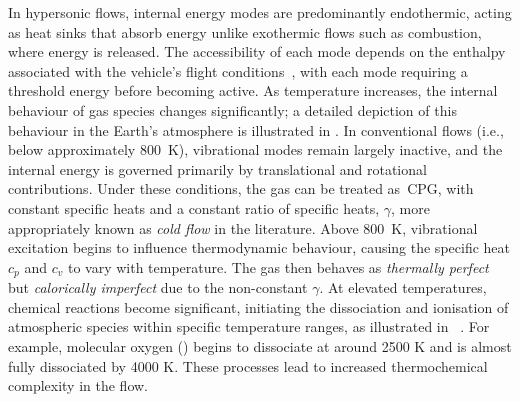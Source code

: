 In hypersonic flows, internal energy modes are predominantly endothermic, acting as heat sinks that absorb energy unlike exothermic flows such as combustion, where energy is released. The accessibility of each mode depends on the enthalpy associated with the vehicle's flight conditions~\citep{Gupta1990}, with each mode requiring a threshold energy before becoming active. As temperature increases, the internal behaviour of gas species changes significantly; a detailed depiction of this behaviour in the Earth's atmosphere is illustrated in . In conventional flows (i.e., below approximately 800~K), vibrational modes remain largely inactive, and the internal energy is governed primarily by translational and rotational contributions. Under these conditions, the gas can be treated as~\gls{CPG}, with constant specific heats and a constant ratio of specific heats, $\gamma$, more appropriately known as \textit{cold flow} in the literature. Above 800~K, vibrational excitation begins to influence thermodynamic behaviour, causing the specific heat $c_p$ and $c_v$ to vary with temperature. The gas then behaves as \emph{thermally perfect} but \emph{calorically imperfect} due to the non-constant $\gamma$. At elevated temperatures, chemical reactions become significant, initiating the dissociation and ionisation of atmospheric species within specific temperature ranges, as illustrated in ~\citep{Scoggins2020}. For example, molecular oxygen () begins to dissociate at around 2500 K and is almost fully dissociated by 4000 K. These processes lead to increased thermochemical complexity in the flow.





